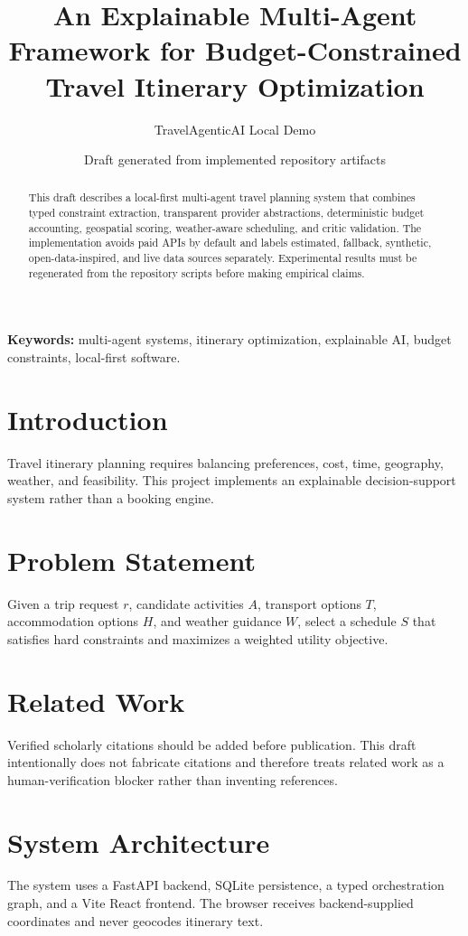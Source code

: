 \documentclass[11pt]{article}
\title{An Explainable Multi-Agent Framework for Budget-Constrained Travel Itinerary Optimization}
\author{TravelAgenticAI Local Demo}
\date{Draft generated from implemented repository artifacts}
\begin{document}
\maketitle

\begin{abstract}
This draft describes a local-first multi-agent travel planning system that combines typed constraint extraction,
transparent provider abstractions, deterministic budget accounting, geospatial scoring, weather-aware scheduling,
and critic validation. The implementation avoids paid APIs by default and labels estimated, fallback, synthetic,
open-data-inspired, and live data sources separately. Experimental results must be regenerated from the repository
scripts before making empirical claims.
\end{abstract}

\textbf{Keywords:} multi-agent systems, itinerary optimization, explainable AI, budget constraints, local-first software.

\section{Introduction}
Travel itinerary planning requires balancing preferences, cost, time, geography, weather, and feasibility. This project
implements an explainable decision-support system rather than a booking engine.

\section{Problem Statement}
Given a trip request $r$, candidate activities $A$, transport options $T$, accommodation options $H$, and weather
guidance $W$, select a schedule $S$ that satisfies hard constraints and maximizes a weighted utility objective.

\section{Related Work}
Verified scholarly citations should be added before publication. This draft intentionally does not fabricate citations
and therefore treats related work as a human-verification blocker rather than inventing references.

\section{System Architecture}
The system uses a FastAPI backend, SQLite persistence, a typed orchestration graph, and a Vite React frontend. The
browser receives backend-supplied coordinates and never geocodes itinerary text.
\end{document}
